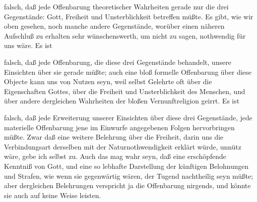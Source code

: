 \begin{aufzb}
\item falsch, daß jede Offenbarung theoretischer Wahrheiten gerade nur die drei Gegenstände: Gott, Freiheit und Unsterblichkeit betreffen müßte. Es gibt, wie wir oben gesehen, noch manche andere Gegenstände, worüber einen näheren Aufschluß zu erhalten sehr wünschenswerth, um nicht zu sagen, nothwendig für uns wäre. Es ist
\item falsch, daß jede Offenbarung, die diese drei Gegenstände behandelt, unsere Einsichten über sie gerade  müßte; auch eine bloß formelle Offenbarung über diese Objecte kann uns von Nutzen seyn, weil selbst Gelehrte oft über die Eigenschaften Gottes, über die Freiheit und Unsterblichkeit des Menschen, und über andere dergleichen Wahrheiten der bloßen Vernunftreligion geirrt. Es ist
\item falsch, daß jede Erweiterung unserer Einsichten über diese drei Gegenstände, jede materielle Offenbarung jene im Einwurfe angegebenen Folgen hervorbringen müßte. Zwar daß eine weitere Belehrung über die Freiheit, darin uns die Verbindungsart derselben mit der Naturnothwendigkeit erklärt würde, unnütz wäre, gebe ich selbst zu. Auch das mag wahr seyn, daß eine erschöpfende Kenntniß von Gott, und eine so lebhafte Darstellung der künftigen Belohnungen und Strafen, wie wenn sie gegenwärtig wären, der Tugend nachtheilig seyn müßte; aber dergleichen Belehrungen verspricht ja die Offenbarung nirgends, und könnte sie auch auf keine Weise leisten.
\end{aufzb}
